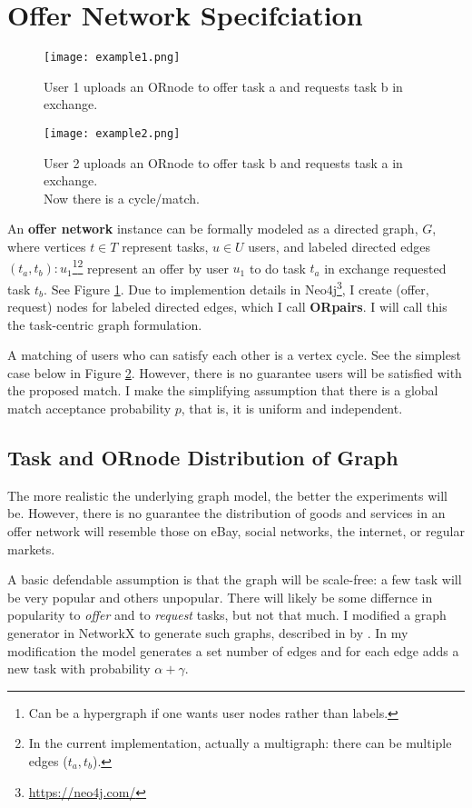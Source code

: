 \documentclass[main.tex]{subfiles}
\begin{document}
\section{Offer Network Specifciation}

\begin{figure}
  \texttt{[image: example1.png]}
  \caption{User 1 uploads an ORnode to offer task a and requests task b in exchange.}
  \label{example1}
\end{figure}

\begin{figure}
  \texttt{[image: example2.png]}
  \caption{User 2 uploads an ORnode to offer task b and requests task a in exchange.
           \\Now there is a cycle/match.}
  \label{example2}
\end{figure}

An \textbf{offer network} instance can be formally modeled as a directed graph, $G$, where vertices $t \in T$ represent tasks, $u \in U$ users, and labeled directed edges $(t_a,t_b) : u_1$\footnote{Can be a hypergraph if one wants user nodes rather than labels.}\footnote{In the current implementation, actually a multigraph: there can be multiple edges ($t_a,t_b$).} represent an offer by user $u_1$ to do task $t_a$ in exchange requested task $t_b$. See Figure \ref{example1}. Due to implemention details in Neo4j\footnote{\url{https://neo4j.com/}}, I create (offer, request) nodes for labeled directed edges, which I call \textbf{ORpairs}. I will call this the task-centric graph formulation.

A matching of users who can satisfy each other is a vertex cycle. See the simplest case below in Figure \ref{example2}. However, there is no guarantee users will be satisfied with the proposed match. I make the simplifying assumption that there is a global match acceptance probability $p$, that is, it is uniform and independent.

\subsection{Task and ORnode Distribution of Graph}
The more realistic the underlying graph model, the better the experiments will be. However, there is no guarantee the distribution of goods and services in an offer network will resemble those on eBay, social networks, the internet, or regular markets.

A basic defendable assumption is that the graph will be scale-free: a few task will be very popular and others unpopular. There will likely be some differnce in popularity to \textit{offer} and to \textit{request} tasks, but not that much. I modified a graph generator in NetworkX \cite{netX} to generate such graphs, described in by \cite{Bol}. In my modification the model generates a set number of edges and for each edge adds a new task with probability $\alpha + \gamma$.
\end{document}
